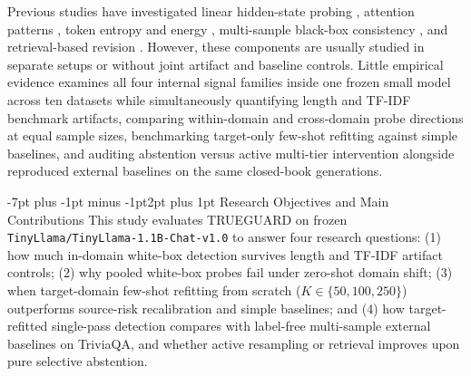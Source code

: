\documentclass[10pt,twocolumn,letterpaper]{article}
\makeatletter
\renewcommand{\subsection}{\@startsection{subsection}{2}{\z@}%
  {-7pt plus -1pt minus -1pt}{2pt plus 1pt}%
  {\normalfont\normalsize\itshape\color{black}}}
\makeatother
\begin{document}
Previous studies have investigated linear hidden-state probing \cite{review27,review28}, attention patterns \cite{review09,review11}, token entropy and energy \cite{review04,review17}, multi-sample black-box consistency \cite{review21}, and retrieval-based revision \cite{review25,review33}. However, these components are usually studied in separate setups or without joint artifact and baseline controls. Little empirical evidence examines all four internal signal families inside one frozen small model across ten datasets while simultaneously quantifying length and TF-IDF benchmark artifacts, comparing within-domain and cross-domain probe directions at equal sample sizes, benchmarking target-only few-shot refitting against simple baselines, and auditing abstention versus active multi-tier intervention alongside reproduced external baselines on the same closed-book generations.

\subsection{Research Objectives and Main Contributions}
This study evaluates TRUEGUARD on frozen \texttt{TinyLlama/TinyLlama-1.1B-Chat-v1.0} to answer four research questions: (1) how much in-domain white-box detection survives length and TF-IDF artifact controls; (2) why pooled white-box probes fail under zero-shot domain shift; (3) when target-domain few-shot refitting from scratch ($K \in \{50, 100, 250\}$) outperforms source-risk recalibration and simple baselines; and (4) how target-refitted single-pass detection compares with label-free multi-sample external baselines on TriviaQA, and whether active resampling or retrieval improves upon pure selective abstention.
\end{document}
